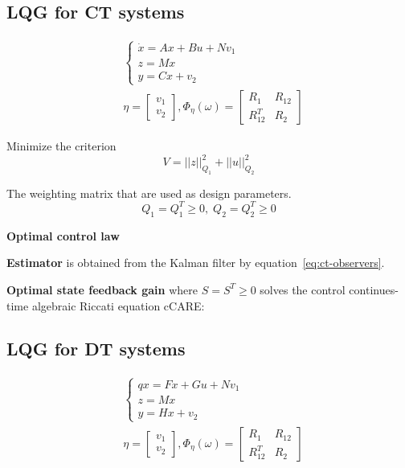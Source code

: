 \begin{multicols}{2}
\subsection{LQG for CT systems}
\begin{align*}
    &\begin{cases}
        \dot{x} = Ax + Bu + Nv_1 \\
        z = Mx \\
        y = Cx + v_2
    \end{cases} \\
    &\eta = \begin{bmatrix} v_1 \\ v_2 \end{bmatrix},
    \Phi_{\eta}(\omega) = \begin{bmatrix} R_1 & R_{12} \\ R^T_{12} & R_2 \end{bmatrix}
\end{align*}

Minimize the criterion
\begin{equation*}
    V = ||z||^2_{Q_1} + ||u||^2_{Q_2}
\end{equation*}

The weighting matrix that are used as design parameters.
\begin{equation*}
    Q_1 = Q_1^T \geq 0,\; Q_2 = Q_2^T \geq 0
\end{equation*}


\textbf{Optimal control law}

\textbf{Estimator} is obtained from the Kalman filter 
by equation~\ref{eq:ct-observers}.

\textbf{Optimal state feedback gain}
where $S=S^T\geq0$ solves the control continues-time algebraic Riccati equation cCARE:


\subsection{LQG for DT systems}
\begin{align*}
    &\begin{cases}
        qx = Fx + Gu + Nv_1 \\
        z = Mx \\
        y = Hx + v_2
    \end{cases} \\
    &\eta = \begin{bmatrix} v_1 \\ v_2 \end{bmatrix},
    \Phi_{\eta}(\omega) = \begin{bmatrix} R_1 & R_{12} \\ R^T_{12} & R_2 \end{bmatrix}
\end{align*}



\end{multicols}
